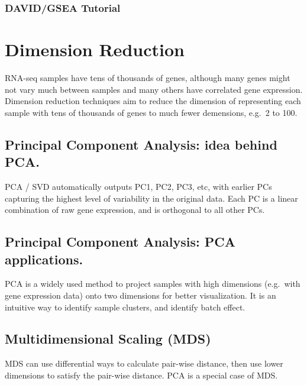 \documentclass[
]{book}
\begin{document}
\hypertarget{davidgsea-tutorial}{%
\subsection{DAVID/GSEA Tutorial}\label{davidgsea-tutorial}}

\hypertarget{dr}{%
\chapter{Dimension Reduction}\label{dr}}

RNA-seq samples have tens of thousands of genes, although many genes might not vary much between samples and many others have correlated gene expression. Dimension reduction techniques aim to reduce the dimension of representing each sample with tens of thousands of genes to much fewer demensions, e.g.~2 to 100.

\hypertarget{principal-component-analysis-idea-behind-pca.}{%
\section{Principal Component Analysis: idea behind PCA.}\label{principal-component-analysis-idea-behind-pca.}}

PCA / SVD automatically outputs PC1, PC2, PC3, etc, with earlier PCs capturing the highest level of variability in the original data. Each PC is a linear combination of raw gene expression, and is orthogonal to all other PCs.

\hypertarget{principal-component-analysis-pca-applications.}{%
\section{Principal Component Analysis: PCA applications.}\label{principal-component-analysis-pca-applications.}}

PCA is a widely used method to project samples with high dimensions (e.g.~with gene expression data) onto two dimensions for better visualization. It is an intuitive way to identify sample clusters, and identify batch effect.

\hypertarget{multidimensional-scaling-mds}{%
\section{Multidimensional Scaling (MDS)}\label{multidimensional-scaling-mds}}

MDS can use differential ways to calculate pair-wise distance, then use lower dimensions to satisfy the pair-wise distance. PCA is a special case of MDS.
\end{document}
